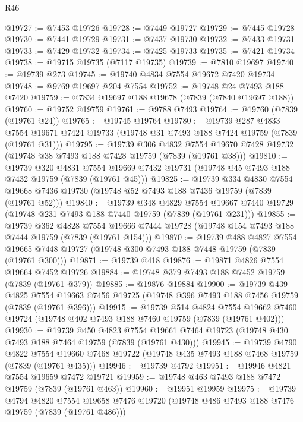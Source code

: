 \begin{lexlean}{R46}
\begin{coremodule}
@19727 := @7453 @19726
@19728 := @7449 @19727
@19729 := @7445 @19728
@19730 := @7441 @19729
@19731 := @7437 @19730
@19732 := @7433 @19731
@19733 := @7429 @19732
@19734 := @7425 @19733
@19735 := @7421 @19734
@19738 := @19715 @19735 (@7117 @19735)
@19739 := @7810 @19697
@19740 := @19739 @273
@19745 := @19740 @4834 @7554 @19672 @7420 @19734
@19748 := @9769 @19697 @204 @7554
@19752 := @19748 @24 @7493 @188 @7420
@19759 := @7834 @19697 @188 @19678 (@7839 (@7840 @19697 @188))
@19760 := @19752 @19759
@19761 := @9788 @7493
@19764 := @19760 (@7839 (@19761 @24))
@19765 := @19745 @19764
@19780 := @19739
    @287
    @4833
    @7554
    @19671
    @7424
    @19733
    (@19748 @31 @7493 @188 @7424 @19759 (@7839 (@19761 @31)))
@19795 := @19739
    @306
    @4832
    @7554
    @19670
    @7428
    @19732
    (@19748 @38 @7493 @188 @7428 @19759 (@7839 (@19761 @38)))
@19810 := @19739
    @320
    @4831
    @7554
    @19669
    @7432
    @19731
    (@19748 @45 @7493 @188 @7432 @19759 (@7839 (@19761 @45)))
@19825 := @19739
    @334
    @4830
    @7554
    @19668
    @7436
    @19730
    (@19748 @52 @7493 @188 @7436 @19759 (@7839 (@19761 @52)))
@19840 := @19739
    @348
    @4829
    @7554
    @19667
    @7440
    @19729
    (@19748 @231 @7493 @188 @7440 @19759 (@7839 (@19761 @231)))
@19855 := @19739
    @362
    @4828
    @7554
    @19666
    @7444
    @19728
    (@19748 @154 @7493 @188 @7444 @19759 (@7839 (@19761 @154)))
@19870 := @19739
    @488
    @4827
    @7554
    @19665
    @7448
    @19727
    (@19748 @300 @7493 @188 @7448 @19759 (@7839 (@19761 @300)))
@19871 := @19739 @418
@19876 := @19871 @4826 @7554 @19664 @7452 @19726
@19884 := @19748 @379 @7493 @188 @7452 @19759 (@7839 (@19761 @379))
@19885 := @19876 @19884
@19900 := @19739
    @439
    @4825
    @7554
    @19663
    @7456
    @19725
    (@19748 @396 @7493 @188 @7456 @19759 (@7839 (@19761 @396)))
@19915 := @19739
    @514
    @4824
    @7554
    @19662
    @7460
    @19724
    (@19748 @402 @7493 @188 @7460 @19759 (@7839 (@19761 @402)))
@19930 := @19739
    @450
    @4823
    @7554
    @19661
    @7464
    @19723
    (@19748 @430 @7493 @188 @7464 @19759 (@7839 (@19761 @430)))
@19945 := @19739
    @4790
    @4822
    @7554
    @19660
    @7468
    @19722
    (@19748 @435 @7493 @188 @7468 @19759 (@7839 (@19761 @435)))
@19946 := @19739 @4792
@19951 := @19946 @4821 @7554 @19659 @7472 @19721
@19959 := @19748 @463 @7493 @188 @7472 @19759 (@7839 (@19761 @463))
@19960 := @19951 @19959
@19975 := @19739
    @4794
    @4820
    @7554
    @19658
    @7476
    @19720
    (@19748 @486 @7493 @188 @7476 @19759 (@7839 (@19761 @486)))

\end{coremodule}
\end{lexlean}
